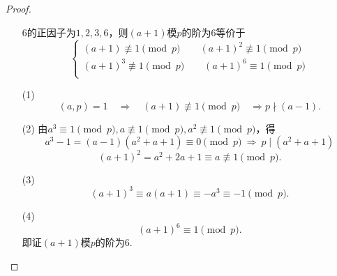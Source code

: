 \documentclass[UTF8]{ctexart}
\begin{document}
\subsection{}   %
\begin{proof}
    \begin{enumerate}
        \item []
        \item []$6$的正因子为$1,2,3,6$，则$(a+1)$模$p$的阶为$6$等价于
        \[
            \begin{cases}
                {(a+1)}     \not \equiv 1 \pmod{p}\qquad                 
                {(a+1)}^{2} \not \equiv 1 \pmod{p}\\             
                {(a+1)}^{3} \not \equiv 1 \pmod{p}\qquad             
                {(a+1)}^{6} \equiv 1 \pmod{p}\\                 
            \end{cases}
        \]
        \item [(1)]
        \[
            (a,p)=1 \quad \Rightarrow \quad 
            (a+1) \not\equiv 1 \pmod{p}  
            \quad \Rightarrow
            p \nmid (a-1).
        \]
        \item [(2)]
        由$a^3 \equiv 1\pmod{p} , a\not\equiv 1\pmod{p} , a^2 \not\equiv 1 \pmod{p}$，得
        \[
            a^3 -1 =(a-1)(a^2+a+1) \equiv 0 \pmod{p}
            \ \Rightarrow\ 
            p\mid (a^2+a+1)
        \]
        \[
            {(a+1)}^2 = a^2 + 2a + 1 \equiv a \not\equiv 1 \pmod{p}. 
        \]
        \item [(3)]
        \[
            {(a+1)}^3 \equiv a(a+1) \equiv -a^3 \equiv -1 \pmod{p}.    
        \]
        \item [(4)]
        \[
            {(a+1)}^6 \equiv 1 \pmod{p}.    
        \]
        即证$(a+1)$模$p$的阶为$6$.
    \end{enumerate}
\end{proof}
\end{document}
